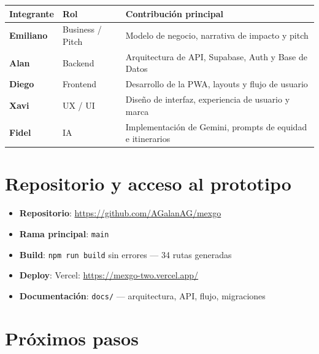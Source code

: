 \documentclass[11pt,a4paper]{article}
\begin{document}
\begin{center}
\begin{tabular}{>{\bfseries}p{2.5cm} p{3cm} p{8cm}}
\toprule
Integrante & Rol & Contribución principal \\
\midrule
Emiliano & Business / Pitch & Modelo de negocio, narrativa de impacto y pitch \\
Alan     & Backend         & Arquitectura de API, Supabase, Auth y Base de Datos \\
Diego    & Frontend        & Desarrollo de la PWA, layouts y flujo de usuario \\
Xavi     & UX / UI         & Diseño de interfaz, experiencia de usuario y marca \\
Fidel    & IA              & Implementación de Gemini, prompts de equidad e itinerarios \\
\bottomrule
\end{tabular}
\end{center}

\section{Repositorio y acceso al prototipo}

\begin{itemize}[leftmargin=*, itemsep=2pt]
  \item \textbf{Repositorio}: \url{https://github.com/AGalanAG/mexgo}
  \item \textbf{Rama principal}: \texttt{main}
  \item \textbf{Build}: \texttt{npm run build} sin errores — 34 rutas generadas
  \item \textbf{Deploy}: Vercel: \url{https://mexgo-two.vercel.app/}
  \item \textbf{Documentación}: \texttt{docs/} — arquitectura, API, flujo,
        migraciones
\end{itemize}

\section{Próximos pasos}
\end{document}
